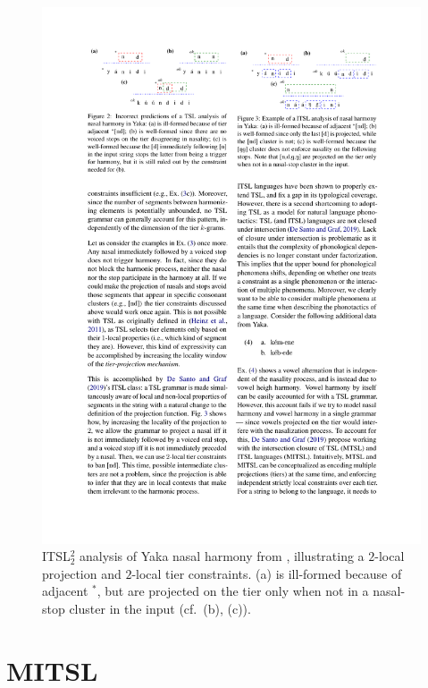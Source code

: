 \documentclass[11pt]{article}
\begin{document}
                   \begin{figure}[htbp]
    \centering
\includegraphics[width=  1\linewidth]{yaka.pdf}
\caption{ITSL$_2^2$ analysis of Yaka nasal
harmony from \citep{de2021learning}, illustrating a $2$-local projection and $2$-local tier constraints. (a) is ill-formed because of adjacent $^*$\textipa{[nd]}, but \textipa{[n,d,g,N]} are projected on the tier only when not in a nasal-stop cluster in the input (cf.\ (b), (c)).}
\label{fig:yaka}
\end{figure}
    
\section{MITSL}
\end{document}
